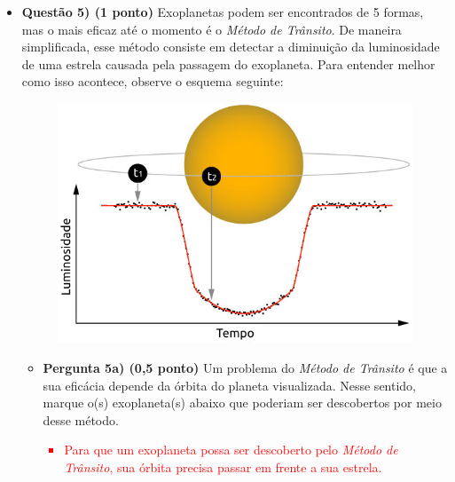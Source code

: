 \documentclass[a4paper, 12pt]{article}
\newcommand{\red}[1]{\textcolor{red}{#1}}
\begin{document}
\begin{flushleft}
\begin{itemize}
		\item \textbf{Questão 5) (1 ponto)} Exoplanetas podem ser encontrados de 5 formas, mas o mais eficaz até o momento é o \textit{Método de Trânsito}. De maneira simplificada, esse método consiste em detectar a diminuição da luminosidade de uma estrela causada pela passagem do exoplaneta. Para entender melhor como isso acontece, observe o esquema seguinte:
			\begin{figure}[H]
				\centering
				\includegraphics[scale=0.7]{./img/5a.png}
			\end{figure}
			\begin{itemize}
				\item \textbf{Pergunta 5a) (0,5 ponto)} Um problema do \textit{Método de Trânsito} é que a sua eficácia depende da órbita do planeta visualizada. Nesse sentido, marque o(s) exoplaneta(s) abaixo que poderiam ser descobertos por meio desse método.
					\red{\begin{itemize}
						\item Para que um exoplaneta possa ser descoberto pelo \textit{Método de Trânsito}, sua órbita precisa passar em frente a sua estrela.
					\end{itemize}}
					\begin{multicols}{3}
						\begin{figure}[H]
							\centering

\end{figure}
\end{multicols}
\end{itemize}
\end{itemize}
\end{flushleft}
\end{document}

